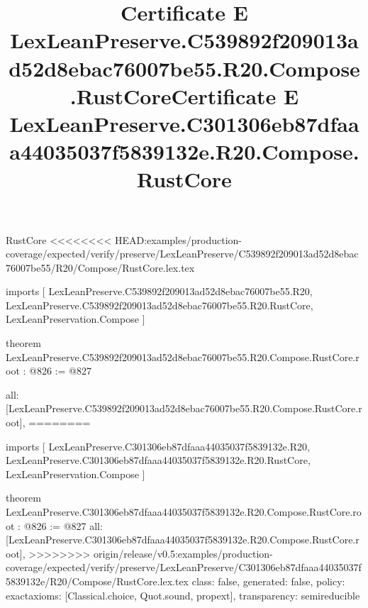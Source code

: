 \begin{lexlean}{RustCore}
<<<<<<<< HEAD:examples/production-coverage/expected/verify/preserve/LexLeanPreserve/C539892f209013ad52d8ebac76007be55/R20/Compose/RustCore.lex.tex
\title{Certificate E LexLeanPreserve.C539892f209013ad52d8ebac76007be55.R20.Compose.RustCore}
\begin{coremodule}
imports [
  LexLeanPreserve.C539892f209013ad52d8ebac76007be55.R20,
  LexLeanPreserve.C539892f209013ad52d8ebac76007be55.R20.RustCore,
  LexLeanPreservation.Compose
]

theorem LexLeanPreserve.C539892f209013ad52d8ebac76007be55.R20.Compose.RustCore.root : @826 := @827 {
  all: [LexLeanPreserve.C539892f209013ad52d8ebac76007be55.R20.Compose.RustCore.root],
========
\title{Certificate E LexLeanPreserve.C301306eb87dfaaa44035037f5839132e.R20.Compose.RustCore}
\begin{coremodule}
imports [
  LexLeanPreserve.C301306eb87dfaaa44035037f5839132e.R20,
  LexLeanPreserve.C301306eb87dfaaa44035037f5839132e.R20.RustCore,
  LexLeanPreservation.Compose
]

theorem LexLeanPreserve.C301306eb87dfaaa44035037f5839132e.R20.Compose.RustCore.root : @826 := @827 {
  all: [LexLeanPreserve.C301306eb87dfaaa44035037f5839132e.R20.Compose.RustCore.root],
>>>>>>>> origin/release/v0.5:examples/production-coverage/expected/verify/preserve/LexLeanPreserve/C301306eb87dfaaa44035037f5839132e/R20/Compose/RustCore.lex.tex
  class: false,
  generated: false,
  policy: exact{axioms: [Classical.choice, Quot.sound, propext]},
  transparency: semireducible
}


\end{coremodule}}
\end{coremodule}
\end{lexlean}
